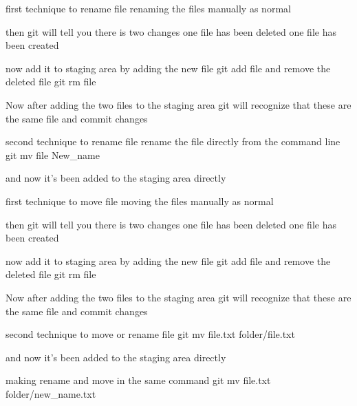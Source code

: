 first technique to rename file
  renaming the files manually as normal 

  then git will tell you there is two changes 
  one file has been deleted 
  one file has been created 

  now add it to staging area 
  by adding the new file           git add file
  and remove the deleted file      git rm file 

  Now after adding the two files to the staging area 
  git will recognize that these are the same file  
  and commit changes 

second technique to rename file
  rename the file directly from the command line 
  git mv file New_name 

  and now it's been added to the staging area directly 


first technique to move file
  moving the files manually as normal 

  then git will tell you there is two changes 
  one file has been deleted 
  one file has been created 

  now add it to staging area 
  by adding the new file           git add file
  and remove the deleted file      git rm file 

  Now after adding the two files to the staging area 
  git will recognize that these are the same file  
  and commit changes 


second technique to move or rename file
  git mv file.txt folder/file.txt

  and now it's been added to the staging area directly 

making rename and move in the same command 
    git mv file.txt folder/new_name.txt